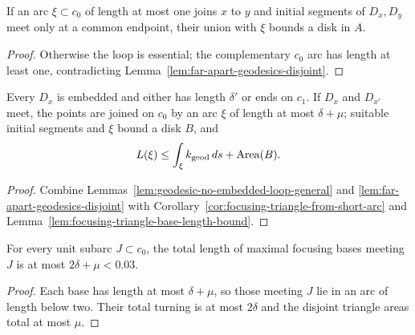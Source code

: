 \begin{corollary}
\label{cor:focusing-triangle-from-short-arc}
\label{noholes}
If an arc $\xi\subset c_0$ of length at most one joins $x$ to $y$ and initial
segments of $D_x,D_y$ meet only at a common endpoint, their union with $\xi$
bounds a disk in $A$.
\end{corollary}
\begin{proof}
\sketch Otherwise the loop is essential; the complementary $c_0$ arc has length at
least one, contradicting Lemma~\ref{lem:far-apart-geodesics-disjoint}.
\end{proof}

\begin{corollary}
\label{cor:geodesic-family-intersection-summary}
\label{focussummary}

Every $D_x$ is embedded and either has length $\delta'$ or ends on $c_1$. If
$D_x$ and $D_{x'}$ meet, the points are joined on $c_0$ by an arc $\xi$ of
length at most $\delta+\mu$; suitable initial segments and $\xi$ bound a disk
$B$, and
\[
L(\xi)\le\int_\xi k_{\mathrm{geod}}\,ds+\operatorname{Area}(B).
\]
\end{corollary}
\begin{proof}
\sketch Combine Lemmas~\ref{lem:geodesic-no-embedded-loop-general} and
\ref{lem:far-apart-geodesics-disjoint} with
Corollary~\ref{cor:focusing-triangle-from-short-arc} and
Lemma~\ref{lem:focusing-triangle-base-length-bound}.
\end{proof}

\begin{claim}
\label{claim:focusing-triangle-total-base-length-bound}
For every unit subarc $J\subset c_0$, the total length of maximal focusing
bases meeting $J$ is at most $2\delta+\mu<0.03$.
\end{claim}
\begin{proof}
\sketch Each base has length at most $\delta+\mu$, so those meeting $J$ lie in an arc
of length below two. Their total turning is at most $2\delta$ and the disjoint
triangle areas total at most $\mu$.
\end{proof}

